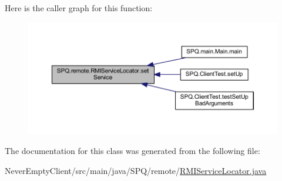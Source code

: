 Here is the caller graph for this function\+:
\nopagebreak
\begin{figure}[H]
\begin{center}
\leavevmode
\includegraphics[width=350pt]{class_s_p_q_1_1remote_1_1_r_m_i_service_locator_ae4d529073f4b435fa3d0fedcaad0fc70_icgraph}
\end{center}
\end{figure}


The documentation for this class was generated from the following file\+:\begin{DoxyCompactItemize}
\item 
Never\+Empty\+Client/src/main/java/\+S\+P\+Q/remote/\mbox{\hyperlink{_r_m_i_service_locator_8java}{R\+M\+I\+Service\+Locator.\+java}}\end{DoxyCompactItemize}
